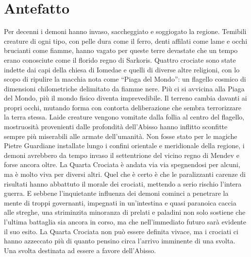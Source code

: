 \chapter{Antefatto}
\label{chp:antefatto}

Per decenni i demoni hanno invaso, saccheggiato e soggiogato la regione. Temibili creature di ogni tipo, con pelle dura come il ferro, denti affilati come lame e occhi brucianti come fiamme, hanno vagato per queste terre devastate che un tempo erano conosciute come il florido regno di Sarkoris. Quattro crociate sono state indette dai capi della chiesa di Iomedae e quelli di diverse altre religioni, con lo scopo di ripulire la macchia nota come ``Piaga del Mondo'': un flagello cosmico di dimensioni chilometriche delimitato da fiamme nere. Pi\`u ci si avvicina alla Piaga del Mondo, pi\`u il mondo fisico diventa imprevedibile. Il terreno cambia davanti ai propri occhi, mutando forma con contorta deliberazione che sembra terrorizzare la terra stessa. Laide creature vengono vomitate dalla follia al centro del flagello, mostruosit\`a provenienti dalle profondit\`a dell'Abisso hanno inflitto sconfitte sempre pi\`u miserabili alle armate dell'umanit\`a. Non fosse stato per le magiche Pietre Guardiane installate lungo i confini orientale e meridionale della regione, i demoni avrebbero da tempo invaso il settentrione del vicino regno di Mendev e forse ancora oltre. La Quarta Crociata \`e andata via via spegnendosi per alcuni, ma \`e molto viva per diversi altri. Quel che \`e certo \`e che le paralizzanti carenze di risultati hanno abbattuto il morale dei crociati, mettendo a serio rischio l'intera guerra. E sebbene l'inquietante influenza dei demoni cominci a penetrare la mente di troppi governanti, impegnati in un'intestina e quasi paranoica caccia alle streghe, una striminzita minoranza di prelati e paladini non solo sostiene che l'ultima battaglia sia ancora in corso, ma che nell'immediato futuro sar\`a evidente il suo esito. La Quarta Crociata non pu\`o essere definita vivace, ma i crociati ci hanno azzeccato pi\`u di quanto pensino circa l'arrivo imminente di una svolta. Una svolta destinata ad essere a favore dell'Abisso.
